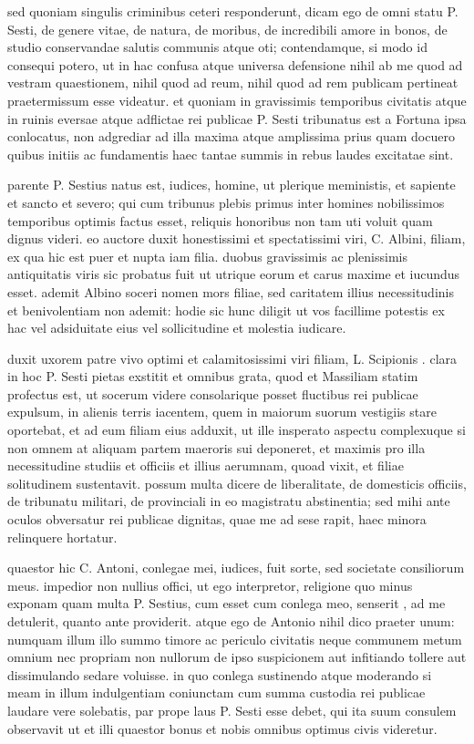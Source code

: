  sed quoniam singulis criminibus ceteri responderunt, dicam ego de omni statu P. Sesti, de genere vitae, de natura, de moribus, de incredibili amore in bonos, de studio conservandae salutis communis atque oti; contendamque, si modo id consequi potero, ut in hac confusa atque universa defensione nihil ab me quod ad vestram quaestionem, nihil quod ad reum, nihil quod ad rem publicam pertineat praetermissum esse videatur. et quoniam in gravissimis temporibus civitatis atque in ruinis eversae atque adflictae rei publicae P. Sesti tribunatus est a Fortuna ipsa conlocatus, non adgrediar ad illa maxima atque amplissima prius quam docuero quibus initiis ac fundamentis haec tantae summis in rebus laudes excitatae sint.

 parente P. Sestius natus est, iudices, homine, ut plerique meministis, et sapiente et sancto et severo; qui cum tribunus plebis primus inter homines nobilissimos temporibus optimis factus esset, reliquis honoribus non tam uti voluit quam dignus videri. eo auctore duxit honestissimi et spectatissimi viri, C. Albini, filiam, ex qua hic est puer et nupta iam filia. duobus gravissimis ac plenissimis antiquitatis viris sic probatus fuit ut utrique eorum et carus maxime et iucundus esset. ademit Albino soceri nomen mors filiae, sed caritatem illius necessitudinis et benivolentiam non ademit: hodie sic hunc diligit ut vos facillime potestis ex hac vel adsiduitate eius vel sollicitudine et molestia iudicare.

 duxit uxorem patre vivo optimi et calamitosissimi viri filiam, L. Scipionis . clara in hoc P. Sesti pietas exstitit et omnibus grata, quod et Massiliam statim profectus est, ut socerum videre consolarique posset fluctibus rei publicae expulsum, in alienis terris iacentem, quem in maiorum suorum vestigiis stare oportebat, et ad eum filiam eius adduxit, ut ille insperato aspectu complexuque si non omnem at aliquam partem maeroris sui deponeret, et maximis pro illa necessitudine studiis et officiis et illius aerumnam, quoad vixit, et filiae solitudinem sustentavit. possum multa dicere de liberalitate, de domesticis officiis, de tribunatu militari, de provinciali in eo magistratu abstinentia; sed mihi ante oculos obversatur rei publicae dignitas, quae me ad sese rapit, haec minora relinquere hortatur.

 quaestor hic C. Antoni, conlegae mei, iudices, fuit sorte, sed societate consiliorum meus. impedior non nullius offici, ut ego interpretor, religione quo minus exponam quam multa P. Sestius, cum esset cum conlega meo, senserit , ad me detulerit, quanto ante providerit. atque ego de Antonio nihil dico praeter unum: numquam illum illo summo timore ac periculo civitatis neque communem metum omnium nec propriam non nullorum de ipso suspicionem aut infitiando tollere aut dissimulando sedare voluisse. in quo conlega sustinendo atque moderando si meam in illum indulgentiam coniunctam cum summa custodia rei publicae laudare vere solebatis, par prope laus P. Sesti esse debet, qui ita suum consulem observavit ut et illi quaestor bonus et nobis omnibus optimus civis videretur.

